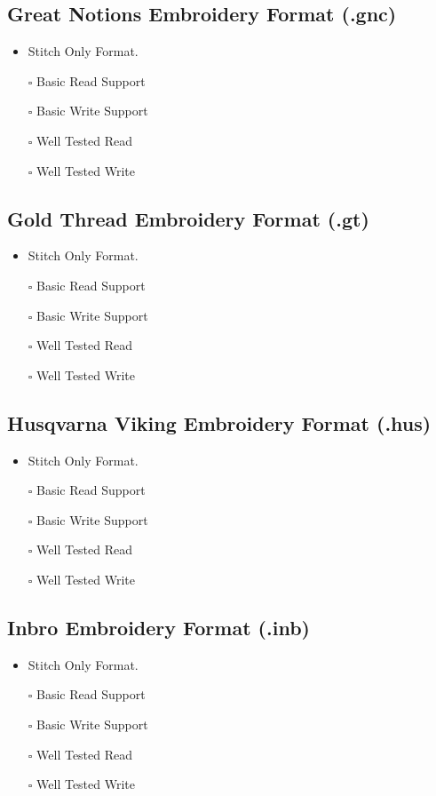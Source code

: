 \documentclass[onesize, a4paper]{refart}
\providecommand{\tightlist}{\setlength{\itemsep}{0pt}\setlength{\parskip}{0pt}}
\begin{document}
\subsection{Great Notions Embroidery Format (.gnc)}

\begin{itemize}
\tightlist
\item Stitch Only Format.
\item[$\square$] Basic Read Support
\item[$\square$] Basic Write Support
\item[$\square$] Well Tested Read
\item[$\square$] Well Tested Write
\end{itemize}

\subsection{Gold Thread Embroidery Format (.gt)}

\begin{itemize}
\tightlist
\item Stitch Only Format.
\item[$\square$] Basic Read Support
\item[$\square$] Basic Write Support
\item[$\square$] Well Tested Read
\item[$\square$] Well Tested Write
\end{itemize}

\subsection{Husqvarna Viking Embroidery Format (.hus)}

\begin{itemize}
\tightlist
\item Stitch Only Format.
\item[$\square$] Basic Read Support
\item[$\square$] Basic Write Support
\item[$\square$] Well Tested Read
\item[$\square$] Well Tested Write
\end{itemize}

\subsection{Inbro Embroidery Format (.inb)}

\begin{itemize}
\tightlist
\item Stitch Only Format.
\item[$\square$] Basic Read Support
\item[$\square$] Basic Write Support
\item[$\square$] Well Tested Read
\item[$\square$] Well Tested Write
\end{itemize}
\end{document}
